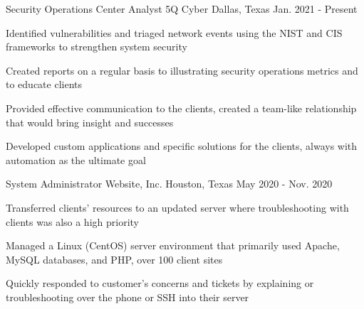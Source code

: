 \begin{cventries}
\cventry
  {Security Operations Center Analyst} %
  {5Q Cyber} %
  {Dallas, Texas} %
  {Jan. 2021 - Present} %
  {
    \begin{cvitems}
      \item {Identified vulnerabilities and triaged network events using the NIST and CIS frameworks to strengthen system security}
      \item {Created reports on a regular basis to illustrating security operations metrics and to educate clients}
      \item {Provided effective communication to the clients, created a team-like relationship that would bring insight and successes}
      \item {Developed custom applications and specific solutions for the clients, always with automation as the ultimate goal} 
    \end{cvitems}
  }
\cventry
  {System Administrator} %
  {Website, Inc.} %
  {Houston, Texas} %
  {May 2020 - Nov. 2020} %
  {
    \begin{cvitems}
      \item{Transferred clients' resources to an updated server where troubleshooting with clients was also a high priority}
      \item {Managed a Linux (CentOS) server environment that primarily used Apache, MySQL databases, and PHP, over 100 client sites}
      \item {Quickly responded to customer's concerns and tickets by explaining or troubleshooting over the phone or SSH into their server}
    \end{cvitems}
  }
  \end{cventries}
